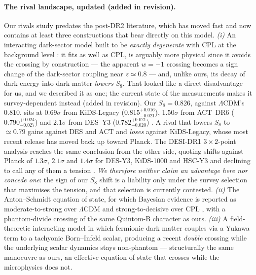 \documentclass[11pt]{article}
\begin{document}
\paragraph{The rival landscape, updated (added in revision).} Our rivals study predates the
post-DR2 literature, which has moved fast and now contains at least three constructions that bear
directly on this model. \emph{(i)} An interacting dark-sector model built to be \emph{exactly
degenerate} with CPL at the background level \cite{IDE2026}: it fits as well as CPL, is arguably
more physical since it avoids the crossing by construction --- the apparent $w=-1$ crossing becomes
a sign change of the dark-sector coupling near $z \simeq 0.8$ --- and, unlike ours, its decay of
dark energy into dark matter \emph{lowers} $S_8$. That looked like a direct disadvantage for us, and we
described it as one; the current state of the measurements makes it survey-dependent instead
(added in revision). Our $S_8 = 0.826$, against $\Lambda$CDM's $0.810$, sits at $0.69\sigma$ from
KiDS-Legacy ($0.815^{+0.016}_{-0.021}$), $1.50\sigma$ from ACT~DR6 ($0.790^{+0.024}_{-0.027}$) and
$2.1\sigma$ from DES~Y3 ($0.782^{+0.021}_{-0.020}$) \cite{S8status2026}. A rival that lowers $S_8$
to $\simeq 0.79$ gains against DES and ACT and \emph{loses} against KiDS-Legacy, whose most recent
release has moved back up toward Planck. The DESI-DR1 $3\times2$-point analysis reaches the same
conclusion from the other side, quoting shifts against Planck of $1.3\sigma$, $2.1\sigma$ and
$1.4\sigma$ for DES-Y3, KiDS-1000 and HSC-Y3 and declining to call any of them a tension
\cite{DESI3x2pt}. \emph{We therefore neither claim an advantage here nor concede one}: the sign of
our $S_8$ shift is a liability only under the survey selection that maximises the tension, and that
selection is currently contested. \emph{(ii)} The Anton--Schmidt equation of state, for which Bayesian evidence is
reported as moderate-to-strong over $\Lambda$CDM and strong-to-decisive over CPL
\cite{AntonSchmidt2026}, with a phantom-divide crossing of the same Quintom-B character as ours.
\emph{(iii)} A field-theoretic interacting model in which fermionic dark matter couples via a
Yukawa term to a tachyonic Born--Infeld scalar, producing a recent \emph{double} crossing while the
underlying scalar dynamics stays non-phantom \cite{IDSFT2026} --- structurally the same manoeuvre
as ours, an effective equation of state that crosses while the microphysics does not.
\end{document}

